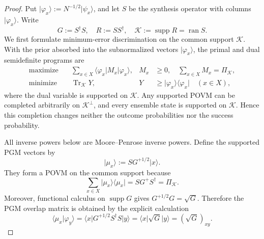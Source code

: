 \documentclass[11pt]{article}
\newcommand{\Tr}{\operatorname{Tr}}
\newcommand{\1}{\mathbf 1}
\newcommand{\supp}{\operatorname{supp}}
\newcommand{\ket}[1]{\lvert #1\rangle}
\newcommand{\bra}[1]{\langle #1\rvert}
\theoremstyle{plain}
\theoremstyle{definition}
\theoremstyle{remark}
\begin{document}
\begin{proof}
Put $\ket{\varphi_x}:=N^{-1/2}\ket{\psi_x}$, and let $S$ be the
synthesis operator with columns $\ket{\varphi_x}$.  Write
\begin{equation}
 G:=S^\dagger S,\quad R:=SS^\dagger,
 \quad \mathcal K:=\supp R=\operatorname{ran}S.
 \label{eq:transitive-pgm-G-R-support}
\end{equation}
We first formulate minimum-error discrimination on the common support
$\mathcal K$.  With the prior absorbed into the subnormalized vectors
$\ket{\varphi_x}$, the primal and dual semidefinite programs are
\begin{align}
 \text{maximize}\quad
 &\sum_{x\in X}\bra{\varphi_x}M_x\ket{\varphi_x},
 &M_x&\ge0,\quad \sum_{x\in X}M_x=\Pi_{\mathcal K},
 \label{eq:transitive-pgm-primal-sdp}\\
 \text{minimize}\quad
 &\Tr_{\mathcal K}Y,
 &Y&\ge\ket{\varphi_x}\!\bra{\varphi_x}
       \quad(x\in X),
 \label{eq:transitive-pgm-dual-sdp}
\end{align}
where the dual variable is supported on $\mathcal K$.  Any supported POVM
can be completed arbitrarily on $\mathcal K^\perp$, and every ensemble state
is supported on $\mathcal K$.  Hence this completion changes neither the
outcome probabilities nor the success probability.

All inverse powers below are Moore--Penrose inverse powers.  Define the
supported PGM vectors by
\begin{equation}
 \ket{\mu_x}:=SG^{+1/2}\ket{x}.
 \label{eq:transitive-pgm-vectors-supported}
\end{equation}
They form a POVM on the common support because
\begin{equation}
 \sum_{x\in X}\ket{\mu_x}\!\bra{\mu_x}
 =SG^+S^\dagger=\Pi_{\mathcal K}.
 \label{eq:transitive-pgm-supported-normalization}
\end{equation}
Moreover, functional calculus on $\supp G$ gives
$G^{+1/2}G=\sqrt G$.  Therefore the PGM overlap matrix is obtained by the
explicit calculation
\begin{equation}
 \langle\mu_x|\varphi_y\rangle
 =\bra{x}G^{+1/2}S^\dagger S\ket{y}
 =\bra{x}\sqrt G\ket{y}
 =(\sqrt G)_{xy}.
 \label{eq:transitive-pgm-overlap-matrix}
\end{equation}


\end{proof}
\end{document}
